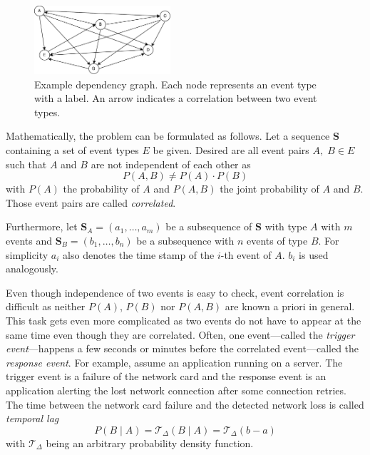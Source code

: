 \documentclass[conference]{IEEEtran}
\theoremstyle{examplestyle}
\begin{document}
\begin{figure}[!tb]
	\centering
	\includegraphics[width=0.45\textwidth]{images/graph.pdf}
	\caption{Example dependency graph. Each node represents an event type with a label. An arrow indicates a correlation between two event types.}
	\label{fig:exampleDependencyGraph}
\end{figure}


Mathematically, the problem can be formulated as follows. Let a sequence \(\pmb{S}\) containing a set of event types \(E\) be given. Desired are all event pairs \(A, \; B \in E\) such that \(A\) and \(B\) are not independent of each other as
\begin{equation}
	P(A, B) \neq P(A) \cdot P(B)
\end{equation}
with \(P(A)\) the probability of \(A\) and \(P(A, B)\) the joint probability of \(A\) and \(B\). Those event pairs are called \textit{correlated}.

Furthermore, let \(\pmb{S}_A = (a_1,\ldots, a_m)\) be a subsequence of \(\pmb{S}\) with type \(A\) with \(m\) events and \(\pmb{S}_B=(b_1,\ldots, b_n)\) be a subsequence with \(n\) events of type \(B\). For simplicity \(a_i\) also denotes the time stamp of the \(i\)-th event of \(A\). \(b_i\) is used analogously.

Even though independence of two events is easy to check, event correlation is difficult as neither \(P(A)\), \(P(B)\) nor \(P(A, B)\) are known a priori in general. This task gets even more complicated as two events do not have to appear at the same time even though they are correlated. Often, one event---called the \textit{trigger event}---happens a few seconds or minutes before the correlated event---called the \textit{response event}. For example, assume an application running on a server. The trigger event is a failure of the network card and the response event is an application alerting the lost network connection after some connection retries. The time between the network card failure and the detected network loss is called \textit{temporal lag}
\begin{equation}
	P(B \; | \; A) = \mathcal{T}_\Delta (B \; | \; A) = \mathcal{T}_\Delta (b - a)
\end{equation}
with \(\mathcal{T}_\Delta\) being an arbitrary probability density function.
\end{document}
